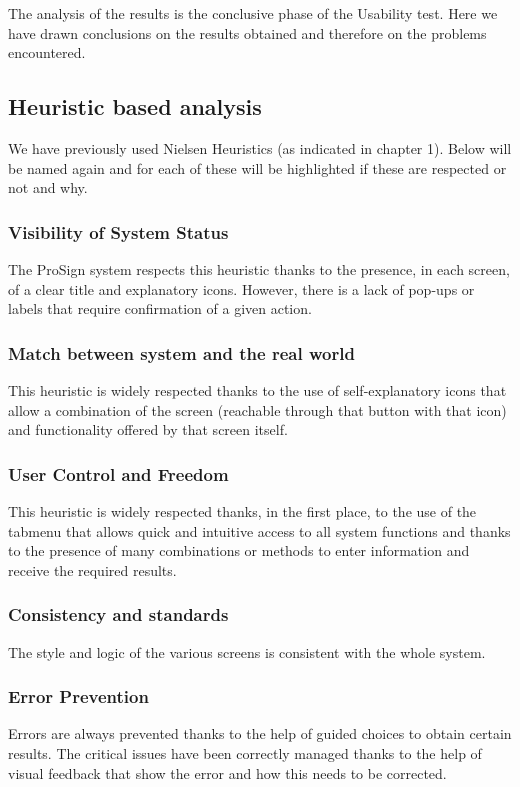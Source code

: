 \lhead{}

The analysis of the results is the conclusive phase of the Usability test. Here we have drawn conclusions on the results obtained and therefore on the problems encountered.

\subsection{Heuristic based analysis}
We have previously used Nielsen Heuristics (as indicated in chapter 1). Below will be named again and for each of these will be highlighted if these are respected or not and why.

\subsubsection{Visibility of System Status}
The ProSign system respects this heuristic thanks to the presence, in each screen, of a clear title and explanatory icons. However, there is a lack of pop-ups or labels that require confirmation of a given action.
\subsubsection{Match between system and the real world}
This heuristic is widely respected thanks to the use of self-explanatory icons that allow a combination of the screen (reachable through that button with that icon) and functionality offered by that screen itself.
\subsubsection{User Control and Freedom}
This heuristic is widely respected thanks, in the first place, to the use of the tabmenu that allows quick and intuitive access to all system functions and thanks to the presence of many combinations or methods to enter information and receive the required results.
\subsubsection{Consistency and standards}
The style and logic of the various screens is consistent with the whole system.
\subsubsection{Error Prevention}
Errors are always prevented thanks to the help of guided choices to obtain certain results. The critical issues have been correctly managed thanks to the help of visual feedback that
show the error and how this needs to be corrected. 
